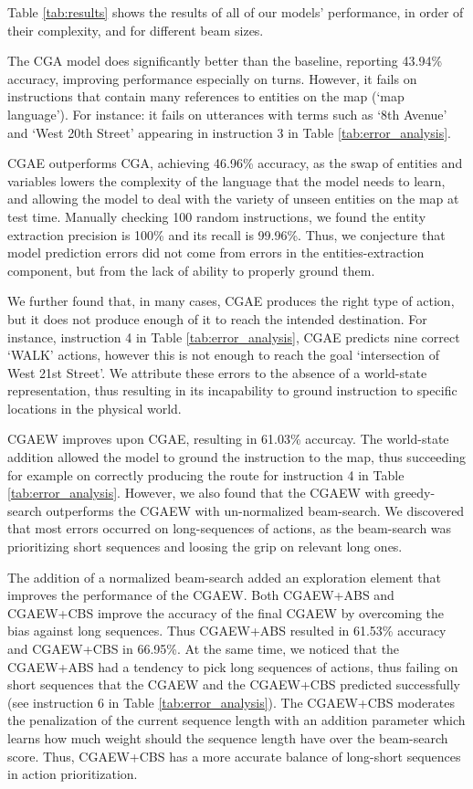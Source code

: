 \documentclass[11pt,a4paper]{article}
\begin{document}
 Table \ref{tab:results} shows the results of all of our models' performance, in order of their complexity, and for different beam sizes. \par

 The CGA model does significantly better than the baseline, reporting  43.94\% accuracy,  improving performance especially on turns. However, it fails on instructions that contain many references to entities on the map (\enquote*{map language}). For instance: it fails on utterances with terms such as \enquote*{8th Avenue} and \enquote*{West 20th Street} appearing in instruction 3 in Table \ref{tab:error_analysis}. 


CGAE outperforms CGA, achieving 46.96\% accuracy, as the swap of entities and variables lowers the complexity of the language that the model needs to learn, and allowing the model to deal with the variety of unseen entities on the map at test time.
Manually checking 100 random instructions, we found the entity extraction precision is 100\% and its recall is 99.96\%. Thus, we conjecture that model prediction errors did not come from errors in the entities-extraction component, but from the lack of ability to properly ground them.

We further found that, in many cases, CGAE produces the right type of action, but it does not produce enough of it to reach the intended destination. For instance, instruction 4 in Table \ref{tab:error_analysis}, CGAE predicts nine correct \enquote*{WALK} actions, however this is not enough to reach the goal \enquote*{intersection of West 21st Street}. We attribute these errors to 
the absence of a world-state representation, thus resulting in its incapability to ground instruction to specific locations in the physical world.


CGAEW improves upon CGAE, resulting in  61.03\% accurcay. The world-state addition allowed the model to ground the instruction to the map, thus succeeding for example on correctly producing the route for instruction 4 in Table \ref{tab:error_analysis}. 
However, we also found that the CGAEW with greedy-search outperforms the CGAEW  with  un-normalized beam-search. We discovered that most errors occurred on long-sequences of actions, as the beam-search was prioritizing short sequences and loosing the grip on relevant long ones.

The addition of a normalized beam-search added an exploration element that improves the performance of the CGAEW. 
Both CGAEW+ABS and CGAEW+CBS improve the accuracy of the final CGAEW by overcoming the bias against long sequences. Thus CGAEW+ABS resulted in 61.53\% accuracy and CGAEW+CBS in 66.95\%. 
%
At the same time, we noticed that the CGAEW+ABS had a tendency to pick long sequences of actions, thus failing on short sequences that the CGAEW and the CGAEW+CBS predicted successfully (see instruction 6 in Table \ref{tab:error_analysis}). The CGAEW+CBS moderates the penalization of the current sequence length with an addition parameter which learns how much weight should the sequence length have over the beam-search score.
Thus,  CGAEW+CBS has a more accurate balance of long-short sequences in action prioritization.
\end{document}
